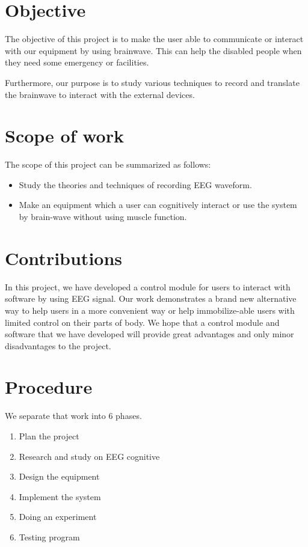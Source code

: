 \section{Objective}
\hspace{1.5cm} The objective of this project is to make the user able to communicate or interact with our equipment by using brainwave. This can help the disabled people when they need some emergency or facilities. \par
Furthermore, our purpose is to study various techniques to record and translate the brainwave to interact with the external devices. 

\section{Scope of work}

The scope of this project can be summarized as follows:
\begin{itemize}
\vspace{-1cm}
	\item Study the theories and techniques of recording EEG waveform.
\vspace{-1cm}
    \item Make an equipment which a user can cognitively interact or use the system by brain-wave without using muscle function.
\end{itemize}  

\section{Contributions}
\hspace{1.5cm} In this project, we have developed a control module for users to interact with software by using EEG signal. Our work demonstrates a brand new alternative way to help users in a more convenient way or help immobilize-able users with limited control on their parts of body. We hope that a control module and software that we have developed will provide great advantages and only minor disadvantages to the project.

\section{Procedure}
We separate that work into 6 phases. 
\begin{enumerate}
\vspace{-0.5cm}
\item Plan the project 
\vspace{-0.25cm}
\item Research and study on EEG cognitive 
\vspace{-0.25cm}
\item Design the equipment 
\vspace{-0.25cm}
\item Implement the system 
\vspace{-0.25cm}
\item Doing an experiment 
\vspace{-0.25cm}
\item Testing program
\end{enumerate}

\newpage



